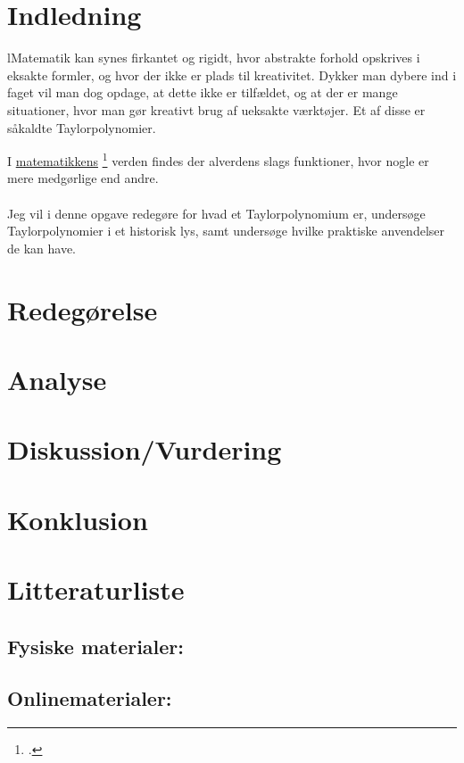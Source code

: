 \documentclass[12pt, a4paper]{article}
\begin{document}
\section{Indledning} %
lMatematik kan synes firkantet og rigidt, hvor abstrakte forhold opskrives i eksakte formler, og hvor der ikke er plads til kreativitet. Dykker man dybere ind i faget vil man dog opdage, at dette ikke er tilfældet, og at der er mange situationer, hvor man gør kreativt brug af ueksakte værktøjer. Et af disse er såkaldte Taylorpolynomier.


I \underline{matematikkens} \footcite{uvm} verden findes der alverdens slags funktioner, hvor nogle er mere medgørlige end andre.\\
\\
Jeg vil i denne opgave redegøre for hvad et Taylorpolynomium er, undersøge Taylorpolynomier i et historisk lys, samt undersøge hvilke praktiske anvendelser de kan have.

\section{Redegørelse} %

\section{Analyse} %

\section{Diskussion/Vurdering} %


\section{Konklusion} %

\section{Litteraturliste}
\nocite{*}
\subsection{Fysiske materialer:}
\printbibliography[keyword=bøger]
\subsection{Onlinematerialer:}
\printbibliography[keyword=online]
\end{document}
